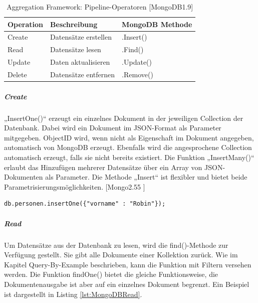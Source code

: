 \begin{table}[htb]
\begin{center}
    \begin{tabular}{| l | p{8cm} | l |}
    \hline
    \textbf{Operation} & \textbf{Beschreibung} & \textbf{MongoDB Methode} \\
    
    \hline
    Create & Datensätze erstellen & .Insert() \\
    
    \hline
	Read & Datensätze lesen & .Find() \\
	
    \hline    
    Update & Daten aktualisieren & .Update() \\ 
   
    \hline    
    Delete & Datensätze entfernen & .Remove()  \\ 
    
    \hline
    \end{tabular}
\end{center}
\caption{Aggregation Framework: Pipeline-Operatoren [MongoDB1.9]}
\end{table}

\subparagraph{Create}
„InsertOne()“ erzeugt ein einzelnes Dokument in der jeweiligen Collection der Datenbank. Dabei wird ein Dokument im JSON-Format als Parameter mitgegeben. ObjectID wird, wenn nicht als Eigenschaft im Dokument angegeben, automatisch von MongoDB erzeugt. Ebenfalls wird die angesprochene Collection automatisch erzeugt, falls sie nicht bereits existiert. Die Funktion „InsertMany()“  erlaubt das Hinzufügen mehrerer Datensätze über ein Array von JSON-Dokumenten als Parameter. Die Methode „Insert“ ist flexibler und bietet beide Parametrisierungsmöglichkeiten. [Mongo2.55 ]
\newline
\begin{lstlisting}[caption=MongoDB Create, label=lst:MongoDBCreate]
db.personen.insertOne({"vorname" : "Robin"});
\end{lstlisting}

\subparagraph{Read}
Um Datensätze aus der Datenbank zu lesen, wird die find()-Methode zur Verfügung gestellt. Sie gibt alle Dokumente einer Kollektion zurück. Wie im Kapitel Query-By-Example beschrieben, kann die Funktion mit Filtern versehen werden. Die Funktion findOne() bietet die gleiche Funktionsweise, die Dokumentenausgabe ist aber auf ein einzelnes Dokument begrenzt. 
Ein Beispiel ist dargestellt in Listing \ref{lst:MongoDBRead}.
\newline\newline

